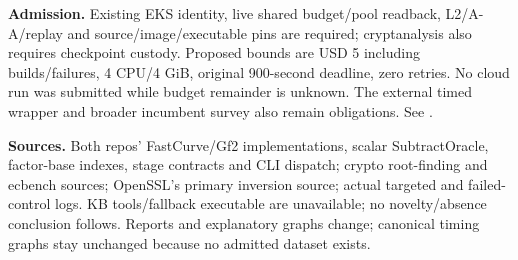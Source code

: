 \documentclass[10pt]{article}
\begin{document}
\textbf{Admission.} Existing EKS identity, live shared budget/pool readback, L2/A-A/replay and source/image/executable pins are required; cryptanalysis also requires checkpoint custody. Proposed bounds are USD 5 including builds/failures, 4 CPU/4 GiB, original 900-second deadline, zero retries. No cloud run was submitted while budget remainder is unknown. The external timed wrapper and broader incumbent survey also remain obligations. See .

\textbf{Sources.} Both repos' FastCurve/Gf2 implementations, scalar SubtractOracle, factor-base indexes, stage contracts and CLI dispatch; crypto root-finding and ecbench sources; OpenSSL's primary inversion source; actual targeted and failed-control logs. KB tools/fallback executable are unavailable; no novelty/absence conclusion follows. Reports and explanatory graphs change; canonical timing graphs stay unchanged because no admitted dataset exists.
\end{document}
